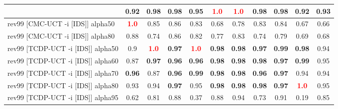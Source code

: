 \documentclass{article}
\begin{document}
\begin{tabular}{|l|r@{$\pm$}rr@{$\pm$}rr@{$\pm$}rr@{$\pm$}rr@{$\pm$}rr@{$\pm$}rr@{$\pm$}rr@{$\pm$}rr@{$\pm$}rr@{$\pm$}r|}
& \multicolumn{2}{c}{0.92}
& \multicolumn{2}{c}{0.98}
& \multicolumn{2}{c}{0.98}
& \multicolumn{2}{c}{0.95}
& \multicolumn{2}{c}{\textbf{\textcolor{red}{1.0}}}
& \multicolumn{2}{c}{\textbf{\textcolor{red}{1.0}}}
& \multicolumn{2}{c}{0.98}
& \multicolumn{2}{c}{0.98}
& \multicolumn{2}{c}{0.92}
& \multicolumn{2}{c|}{0.93}
\\
\hline
rev99 [CMC-UCT -i [IDS]] alpha50
& \multicolumn{2}{c}{\textbf{\textcolor{red}{1.0}}}
& \multicolumn{2}{c}{0.85}
& \multicolumn{2}{c}{0.86}
& \multicolumn{2}{c}{0.83}
& \multicolumn{2}{c}{0.68}
& \multicolumn{2}{c}{0.78}
& \multicolumn{2}{c}{0.83}
& \multicolumn{2}{c}{0.84}
& \multicolumn{2}{c}{0.67}
& \multicolumn{2}{c|}{0.66}
\\
rev99 [CMC-UCT -i [IDS]] alpha80
& \multicolumn{2}{c}{0.88}
& \multicolumn{2}{c}{0.74}
& \multicolumn{2}{c}{0.86}
& \multicolumn{2}{c}{0.82}
& \multicolumn{2}{c}{0.77}
& \multicolumn{2}{c}{0.83}
& \multicolumn{2}{c}{0.74}
& \multicolumn{2}{c}{0.79}
& \multicolumn{2}{c}{0.69}
& \multicolumn{2}{c|}{0.68}
\\
rev99 [TCDP-UCT -i [IDS]] alpha50
& \multicolumn{2}{c}{0.9}
& \multicolumn{2}{c}{\textbf{\textcolor{red}{1.0}}}
& \multicolumn{2}{c}{\textbf{0.97}}
& \multicolumn{2}{c}{\textbf{\textcolor{red}{1.0}}}
& \multicolumn{2}{c}{\textbf{0.98}}
& \multicolumn{2}{c}{\textbf{0.98}}
& \multicolumn{2}{c}{\textbf{0.97}}
& \multicolumn{2}{c}{\textbf{0.99}}
& \multicolumn{2}{c}{\textbf{0.98}}
& \multicolumn{2}{c|}{0.94}
\\
rev99 [TCDP-UCT -i [IDS]] alpha60
& \multicolumn{2}{c}{0.87}
& \multicolumn{2}{c}{\textbf{0.97}}
& \multicolumn{2}{c}{\textbf{0.96}}
& \multicolumn{2}{c}{\textbf{0.96}}
& \multicolumn{2}{c}{\textbf{0.98}}
& \multicolumn{2}{c}{\textbf{0.98}}
& \multicolumn{2}{c}{\textbf{0.98}}
& \multicolumn{2}{c}{\textbf{0.97}}
& \multicolumn{2}{c}{\textbf{0.99}}
& \multicolumn{2}{c|}{0.95}
\\
rev99 [TCDP-UCT -i [IDS]] alpha70
& \multicolumn{2}{c}{\textbf{0.96}}
& \multicolumn{2}{c}{0.87}
& \multicolumn{2}{c}{\textbf{0.96}}
& \multicolumn{2}{c}{\textbf{0.99}}
& \multicolumn{2}{c}{\textbf{0.98}}
& \multicolumn{2}{c}{\textbf{0.98}}
& \multicolumn{2}{c}{\textbf{0.96}}
& \multicolumn{2}{c}{\textbf{0.97}}
& \multicolumn{2}{c}{0.94}
& \multicolumn{2}{c|}{0.94}
\\
rev99 [TCDP-UCT -i [IDS]] alpha80
& \multicolumn{2}{c}{0.93}
& \multicolumn{2}{c}{0.94}
& \multicolumn{2}{c}{\textbf{0.97}}
& \multicolumn{2}{c}{0.95}
& \multicolumn{2}{c}{\textbf{0.98}}
& \multicolumn{2}{c}{\textbf{0.98}}
& \multicolumn{2}{c}{\textbf{0.98}}
& \multicolumn{2}{c}{\textbf{0.97}}
& \multicolumn{2}{c}{\textbf{\textcolor{red}{1.0}}}
& \multicolumn{2}{c|}{0.95}
\\
rev99 [TCDP-UCT -i [IDS]] alpha95
& \multicolumn{2}{c}{0.62}
& \multicolumn{2}{c}{0.81}
& \multicolumn{2}{c}{0.88}
& \multicolumn{2}{c}{0.37}
& \multicolumn{2}{c}{0.88}
& \multicolumn{2}{c}{0.94}
& \multicolumn{2}{c}{0.73}
& \multicolumn{2}{c}{0.91}
& \multicolumn{2}{c}{0.19}
& \multicolumn{2}{c|}{0.85}
\\
\hline
\end{tabular}%
\end{document}

